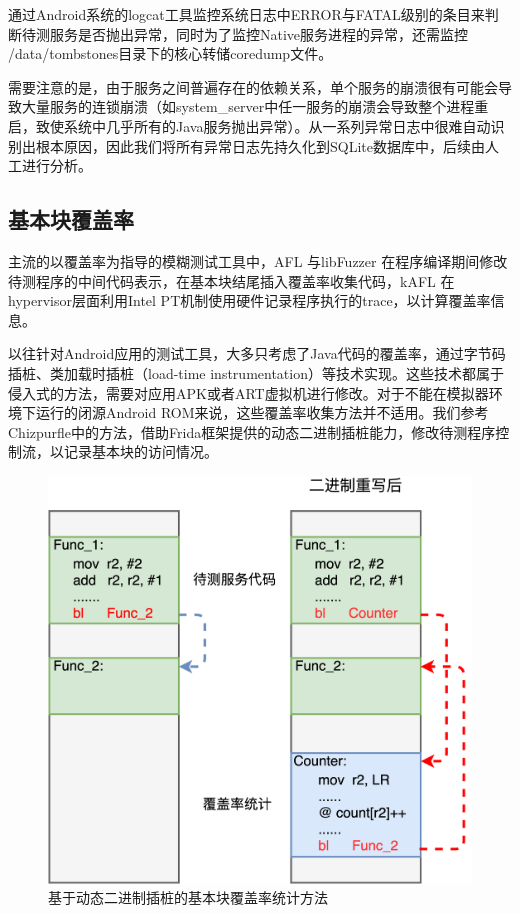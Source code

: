 \documentclass[winfonts,master,twoside]{njuthesis}
\begin{document}
通过Android系统的logcat工具监控系统日志中ERROR与FATAL级别的条目来判断待测服务是否抛出异常，同时为了监控Native服务进程的异常，还需监控 /data/tombstones目录下的核心转储coredump文件。

需要注意的是，由于服务之间普遍存在的依赖关系，单个服务的崩溃很有可能会导致大量服务的连锁崩溃（如system\_server中任一服务的崩溃会导致整个进程重启，致使系统中几乎所有的Java服务抛出异常）。从一系列异常日志中很难自动识别出根本原因，因此我们将所有异常日志先持久化到SQLite数据库中，后续由人工进行分析。

\subsection{基本块覆盖率}

主流的以覆盖率为指导的模糊测试工具中，AFL \cite{afl}与libFuzzer \cite{libfuzzer}在程序编译期间修改待测程序的中间代码表示，在基本块结尾插入覆盖率收集代码，kAFL \cite{schumilo2017kafl}在hypervisor层面利用Intel PT机制使用硬件记录程序执行的trace，以计算覆盖率信息。

以往针对Android应用的测试工具，大多只考虑了Java代码的覆盖率，通过字节码插桩\cite{acvtool}、类加载时插桩（load-time instrumentation）\cite{sun2017adrenalin}等技术实现。这些技术都属于侵入式的方法，需要对应用APK或者ART虚拟机进行修改。对于不能在模拟器环境下运行的闭源Android ROM来说，这些覆盖率收集方法并不适用。我们参考Chizpurfle中的方法，借助Frida框架提供的动态二进制插桩能力，修改待测程序控制流，以记录基本块的访问情况。

\begin{figure}
	\centering
	\includegraphics[width=.7\textwidth]{figure/4-fuzzer/bbcov-impl.png}
	\caption{基于动态二进制插桩的基本块覆盖率统计方法}
	\label{bbcov-impl}
\end{figure}
\end{document}
